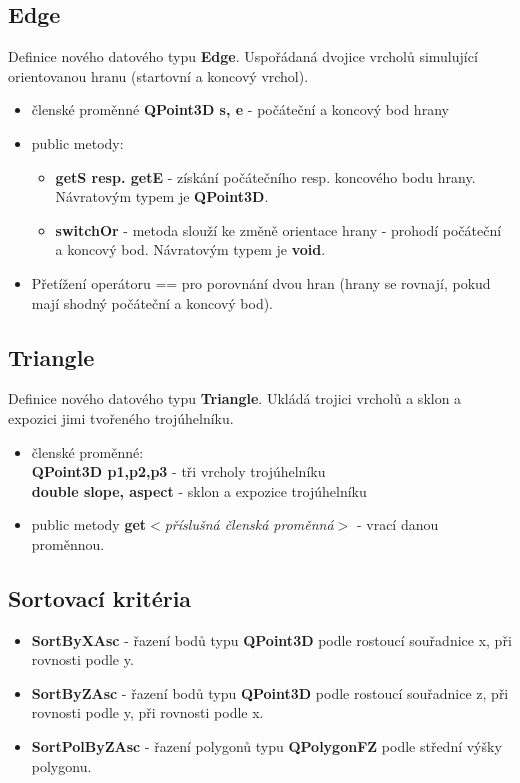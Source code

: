 \documentclass[a4paper, 12pt]{article}
\begin{document}
\subsection{Edge}
Definice nového datového typu \textbf{Edge}. Uspořádaná dvojice vrcholů simulující orientovanou hranu (startovní a koncový vrchol).

\begin{itemize}
	\item členské proměnné \textbf{QPoint3D s, e} - počáteční a koncový bod hrany
	\item public metody:
	\begin{itemize}
		\item \textbf{getS resp. getE} - získání počátečního resp. koncového bodu hrany. Návratovým typem je \textbf{QPoint3D}. 
		\item \textbf{switchOr} - metoda slouží ke změně orientace hrany - prohodí počáteční a koncový bod. Návratovým typem je \textbf{void}. 
	\end{itemize}
	\item Přetížení operátoru == pro porovnání dvou hran (hrany se rovnají, pokud mají shodný počáteční a koncový bod).
\end{itemize}

\subsection{Triangle}
Definice nového datového typu \textbf{Triangle}. Ukládá trojici vrcholů a sklon a expozici jimi tvořeného trojúhelníku.

\begin{itemize}
	\item členské proměnné:\\ \textbf{QPoint3D p1,p2,p3} - tři vrcholy trojúhelníku \\
	\textbf{double slope, aspect} - sklon a expozice trojúhelníku
	\item public metody \textbf{get$<$}\textit{příslušná členská proměnná}\textbf{$>$} - vrací danou proměnnou.
\end{itemize}

\subsection{Sortovací kritéria}
\begin{itemize}
\item \textbf{SortByXAsc} - řazení bodů typu \textbf{QPoint3D} podle rostoucí souřadnice x, při rovnosti podle y.
\item \textbf{SortByZAsc} - řazení bodů typu \textbf{QPoint3D} podle rostoucí souřadnice z, při rovnosti podle y, při rovnosti podle x.
\item \textbf{SortPolByZAsc} - řazení polygonů typu \textbf{QPolygonFZ} podle střední výšky polygonu.
\end{itemize}
\end{document}
